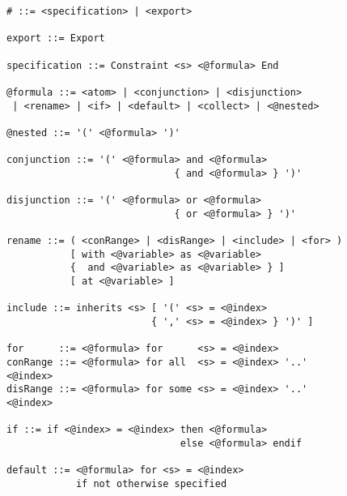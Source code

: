 \begin{figure}[h]
\begin{lstlisting}[language=BNF,basicstyle=\linespread{0.8}\ttfamily,
                   captionpos=t,caption=
   {Verbatim display of the grammar file that is used to generate the parser for
    CAnDL.
    The file is in a custom version of Backus–Naur form.
    In the parse tree, all expressions that start with ``{@}'' are
    automatically expanded.
    The character ``\#'' marks the top-level language construct.
    Any expression that does not ultimately become part of this construct
    constitutes a syntax error.\parfillskip=0pt}]
# ::= <specification> | <export>

export ::= Export

specification ::= Constraint <s> <@formula> End

@formula ::= <atom> | <conjunction> | <disjunction>
 | <rename> | <if> | <default> | <collect> | <@nested>

@nested ::= '(' <@formula> ')'

conjunction ::= '(' <@formula> and <@formula>
                             { and <@formula> } ')'

disjunction ::= '(' <@formula> or <@formula>
                             { or <@formula> } ')'

rename ::= ( <conRange> | <disRange> | <include> | <for> )
           [ with <@variable> as <@variable>
           {  and <@variable> as <@variable> } ]
           [ at <@variable> ]

include ::= inherits <s> [ '(' <s> = <@index>
                         { ',' <s> = <@index> } ')' ]

for      ::= <@formula> for      <s> = <@index>
conRange ::= <@formula> for all  <s> = <@index> '..' <@index>
disRange ::= <@formula> for some <s> = <@index> '..' <@index>

if ::= if <@index> = <@index> then <@formula>
                              else <@formula> endif

default ::= <@formula> for <s> = <@index>
            if not otherwise specified

\end{lstlisting}
\end{figure}

